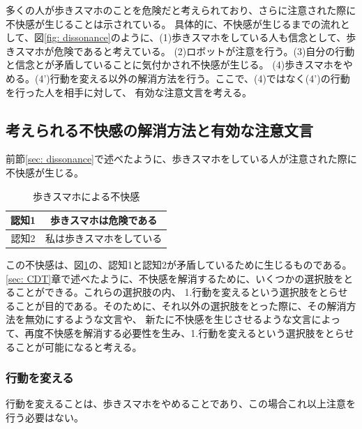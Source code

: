 \documentclass[11pt,a4j]{jreport}
\begin{document}
多くの人が歩きスマホのことを危険だと考えられており、さらに注意された際に不快感が生じることは示されている\cite{Schneider2022}。
具体的に、不快感が生じるまでの流れとして、図\ref{fig: dissonance}のように、(1)歩きスマホをしている人も信念として、歩きスマホが危険であると考えている。
(2)ロボットが注意を行う。(3)自分の行動と信念とが矛盾していることに気付かされ不快感が生じる。
(4)歩きスマホをやめる。(4')行動を変える以外の解消方法を行う。ここで、(4)ではなく(4')の行動を行った人を相手に対して、
有効な注意文言を考える。

\subsection{考えられる不快感の解消方法と有効な注意文言}
前節\ref{sec: dissonance}で述べたように、歩きスマホをしている人が注意された際に不快感が生じる。
\begin{table}[h]
  \centering
  \caption{歩きスマホによる不快感}
  \label{fig: UsingPhone}
  \begin{tabular}{c|c}
      認知1 & 歩きスマホは危険である  \\ \hline
      認知2 & 私は歩きスマホをしている \\
  \end{tabular}
\end{table}
この不快感は、図\ref{fig: UsingPhone}の、認知1と認知2が矛盾しているために生じるものである。
\ref{sec: CDT}章で述べたように、不快感を解消するために、いくつかの選択肢をとることができる。これらの選択肢の内、
1.行動を変えるという選択肢をとらせることが目的である。そのために、それ以外の選択肢をとった際に、その解消方法を無効にするような文言や、
新たに不快感を生じさせるような文言によって、再度不快感を解消する必要性を生み、1.行動を変えるという選択肢をとらせることが可能になると考える。

\subsubsection{行動を変える}
行動を変えることは、歩きスマホをやめることであり、この場合これ以上注意を行う必要はない。
\end{document}
